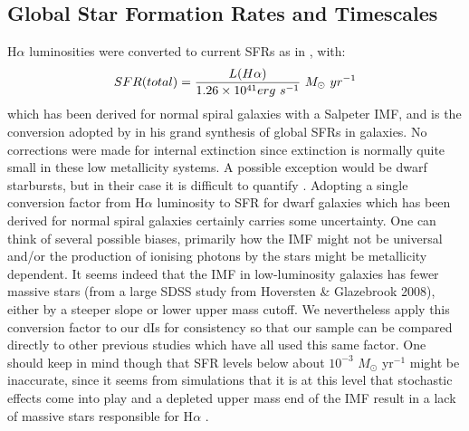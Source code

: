 \documentclass[preprint]{aastex}
\begin{document}
\subsection{Global Star Formation Rates and Timescales}

H$\alpha$ luminosities were converted to current SFRs as in
\citet{ktc94},  with:
\begin{equation}
SFR(total) = {{L(H\alpha )}\over{1.26\times 10^{41} erg\  s^{-1}}}\
 M_\odot\  yr^{-1}
\end{equation}
which has been derived for normal spiral galaxies with a Salpeter IMF, 
and is the conversion adopted by \citet{k98} in his grand synthesis of
global SFRs in galaxies.  
No corrections were made 
for internal extinction \citep[as had been done for spiral galaxies in][]{k98}
since extinction is normally quite small in these low metallicity systems.
A possible exception would be dwarf starbursts, but in their case it is 
difficult to quantify \citep[see, e.g.,][]{cdsbcm03}. 
Adopting a single conversion factor from H$\alpha$ luminosity to SFR 
for dwarf galaxies which has been derived for normal spiral galaxies certainly
carries some uncertainty.
One can think of several possible biases, primarily
how the IMF might not be universal and/or the production of ionising photons 
by the stars 
might be metallicity dependent. It seems indeed that the IMF in low-luminosity
galaxies has fewer massive stars (from a large SDSS study from Hoversten \& Glazebrook 2008),
either by a steeper slope or lower upper mass cutoff. We nevertheless apply 
this conversion
factor to our dIs for consistency so that our sample can be compared 
directly to other previous studies which have all used this same factor.
One should keep in mind though that SFR levels below about 
$10^{-3}$ $M_{\odot}$ yr$^{-1}$ might be inaccurate, since it seems from simulations
that it is at 
this level that stochastic effects come into play and a depleted upper mass end
of the IMF result in a lack of massive stars responsible for H$\alpha$ \citep{tre07}.
\end{document}
